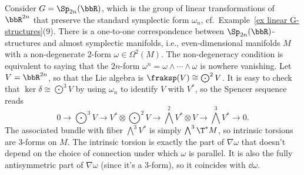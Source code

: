 \begin{example}\label{ex almost symplectic structures}
    Consider $G=\Sp_{2n}(\bbR)$, which is the group of linear transformations of $\bbR^{2n}$ that preserve the standard symplectic form $\omega_n$, cf.\ Example~\ref{ex linear G-structures}(9). There is a one-to-one correspondence between $\Sp_{2n}(\bbR)$-structures and almost symplectic manifolds, i.e., even-dimensional manifolds $M$ with a non-degenerate $2$-form $\omega\in \Omega^2(M)$. The non-degeneracy condition is equivalent to saying that the $2n$-form $\omega^n=\omega\wedge\cdots\wedge\omega$ is nowhere vanishing.
    Let $V=\bbR^{2n}$, so that the Lie algebra is $\fraksp(V)\cong \bigodot^2 V$. It is easy to check that $\ker\delta\cong \bigodot^3 V$ by using $\omega_n$ to identify $V$ with $V^\ast$, so the Spencer sequence reads 
    \[0\to \bigodot^3 V\to V^\ast \otimes \bigodot^2V\to \bigwedge^2 V^\ast\otimes V\to \bigwedge^3 V^\ast\to 0.\]
    The associated bundle with fiber $\bigwedge^3 V^\ast$ is simply $\bigwedge^3 \T^\ast M$, so intrinsic torsions are $3$-forms on $M$. The intrinsic torsion is exactly the part of $\nabla\omega$ that doesn't depend on the choice of connection under which $\omega$ is parallel. It is also the fully antisymmetric part of $\nabla\omega$ (since it's a $3$-form), so it coincides with $\dd\omega$.


\end{example}

